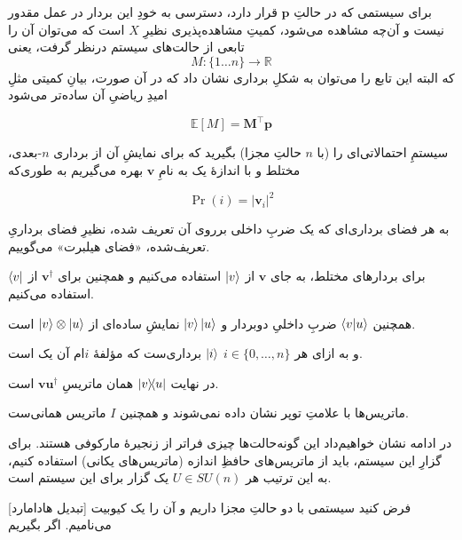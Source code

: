 
برای سیستمی که در حالتِ 
\(\mathbf{p}\)
قرار دارد، دسترسی به خودِ این بردار در عمل مقدور نیست و آن‌چه مشاهده می‌شود، کمیتِ مشاهده‌پذیری نظیرِ 
\( X \)
است که می‌توان آن را تابعی از حالت‌های سیستم درنظر گرفت، یعنی
\begin{equation} M : \{ 1 \dots n \} \to \mathbb{R} \end{equation}
که البته این تابع را می‌توان به شکلِ برداری نشان داد که در آن صورت، بیانِ کمیتی مثلِ امیدِ ریاضیِ آن ساده‌تر می‌شود

\begin{equation} \mathbb{E}[M] = \mathbf{M}^\intercal \mathbf{p} \end{equation}

سیستمِ احتمالاتی‌ای را (با \( n \) حالتِ مجزا) بگیرید که برای نمایشِ آن از برداری \( n \)-بعدی، مختلط و با اندازهٔ یک  به نامِ 
\(\mathbf{v}\)
بهره می‌گیریم به طوری‌که

\begin{equation} \Pr(i) = |\mathbf{v}_i|^2\end{equation}

به هر فضای برداری‌ای که یک ضربِ داخلی برروی آن تعریف شده، نظیرِ فضای برداریِ تعریف‌شده، «فضای هیلبرت» می‌گوییم.

برای بردارهای مختلط، به جای 
\(\mathbf{v}\)
از
\(\ket{v}\)
استفاده می‌کنیم و همچنین برای
\(\mathbf{v}^\dagger\)
از 
\(\bra{v}\)
استفاده می‌کنیم.

همچنین
\(\braket{v}{u}\)
ضربِ داخلیِ دوبردار و 
\(\ket{v}\ket{u}\)
نمایشِ ساده‌ای از
\(\ket{v}\otimes\ket{u}\)
است.

و به ازای هر 
\(i \in \{ 0, \dots , n \}\)
\(\ket{i}\)
برداری‌ست که مؤلفهٔ \(i\)ام آن یک است.

در نهایت
\(\dyad{v}{u}\)
همان ماتریسِ
\(\mathbf{v}\mathbf{u}^\dagger\)
است.

ماتریس‌ها با علامتِ توپر نشان داده نمی‌شوند و همچنین \(I\) ماتریس همانی‌ست.


در ادامه نشان خواهیم‌داد این گونه‌حالت‌ها چیزی فراتر از زنجیرهٔ مارکوفی هستند.
برای گزارِ این سیستم، باید از ماتریس‌های حافظِ اندازه (ماتریس‌های یکانی) استفاده کنیم، به این ترتیب هر 
\(U \in SU(n)\)
یک گزار برای این سیستم است.

[تبدیل هادامارد]
فرض کنید سیستمی با دو حالتِ مجزا داریم و آن را یک کیوبیت می‌نامیم.
اگر بگیریم

